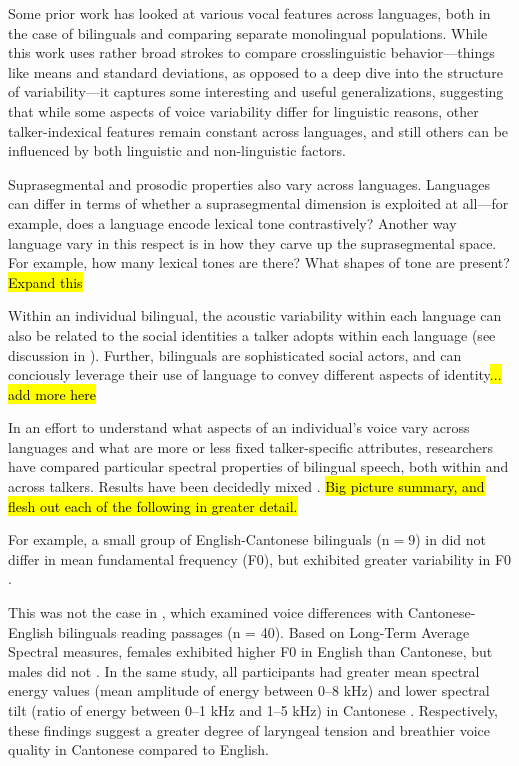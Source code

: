 Some prior work has looked at various vocal features across languages, both in the case of bilinguals and comparing separate monolingual populations. While this work uses rather broad strokes to compare crosslinguistic behavior---things like means and standard deviations, as opposed to a deep dive into the structure of variability---it captures some interesting and useful generalizations, suggesting that while some aspects of voice variability differ for linguistic reasons, other talker-indexical features remain constant across languages, and still others can be influenced by both linguistic and non-linguistic factors. 

Suprasegmental and prosodic properties also vary across languages. Languages can differ in terms of whether a suprasegmental dimension is exploited at all---for example, does a language encode lexical tone contrastively? Another way language vary in this respect is in how they carve up the suprasegmental space. For example, how many lexical tones are there? What shapes of tone are present? \hl{Expand this}

Within an individual bilingual, the acoustic variability within each language can also be related to the social identities a talker adopts within each language (see discussion in \citet{cheng_2020_f0}). Further, bilinguals are sophisticated social actors, and can conciously leverage their use of language to convey different aspects of identity\hl{... add more here}

In an effort to understand what aspects of an individual's voice vary across languages and what are more or less fixed talker-specific attributes, researchers have compared particular spectral properties of bilingual speech, both within and across talkers. Results have been decidedly mixed \citep{cheng_2020_f0,altenberg_2006_f0,ryabov_2016_self}. \hl{Big picture summary, and flesh out each of the following in greater detail.}

For example, a small group of English-Cantonese bilinguals (n$=$9) in did not differ in mean fundamental frequency (F0), but exhibited greater variability in F0 \citep{altenberg_2006_f0}. 

This was not the case in \citet{ng_2012_ltas}, which examined voice differences with Cantonese-English bilinguals reading passages (n = 40). Based on Long-Term Average Spectral measures, females exhibited higher F0 in English than Cantonese, but males did not \citep{ng_2012_ltas}. In the same study, all participants had greater mean spectral energy values (mean amplitude of energy between 0--8 kHz) and lower spectral tilt (ratio of energy between 0--1 kHz and 1--5 kHz) in Cantonese \citep{ng_2012_ltas}. Respectively, these findings suggest a greater degree of laryngeal tension and breathier voice quality in Cantonese compared to English.

